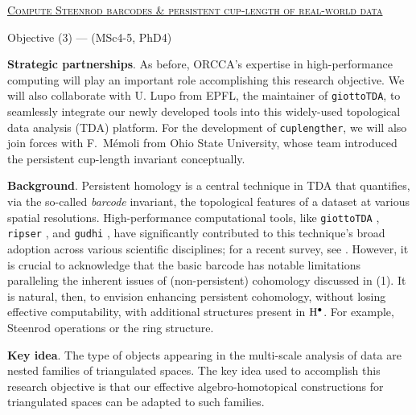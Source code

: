 
\smallskip
{\centering \underline{\textsc{Compute Steenrod barcodes \& persistent cup-length of real-world data}}\par}
{\centering Objective (3) \hspace*{2cm} --- \hspace*{2cm} (MSc4-5, PhD4)\par}

\smallskip\textbf{Strategic partnerships}.
As before, ORCCA's expertise in high-performance computing will play an important role accomplishing this research objective.
We will also collaborate with U. Lupo from EPFL, the maintainer of \texttt{giottoTDA}, to seamlessly integrate our newly developed tools into this widely-used topological data analysis (TDA) platform.
For the development of \texttt{cuplengther}, we will also join forces with F.~Mémoli from Ohio State University, whose team introduced the persistent cup-length invariant conceptually.

\smallskip\noindent\textbf{Background}.
Persistent homology is a central technique in TDA that quantifies, via the so-called \textit{barcode} invariant, the topological features of a dataset at various spatial resolutions.
High-performance computational tools, like \texttt{giottoTDA} \cite{medina2021giotto}, \texttt{ripser} \cite{bauer2021ripser}, and \texttt{gudhi} \cite{maria2014gudhi}, have significantly contributed to this technique's broad adoption across various scientific disciplines; for a recent survey, see \cite{carlsson2021topological}.
However, it is crucial to acknowledge that the basic barcode has notable limitations paralleling the inherent issues of (non-persistent) cohomology discussed in (1).
It is natural, then, to envision enhancing persistent cohomology, without losing effective computability, with additional structures present in $\mathrm{H}^\bullet$.
For example, Steenrod operations or the ring structure.

\medskip\noindent\textbf{Key idea}.
The type of objects appearing in the multi-scale analysis of data are nested families of triangulated spaces.
The key idea used to accomplish this research objective is that our effective algebro-homotopical constructions for triangulated spaces can be adapted to such families.

